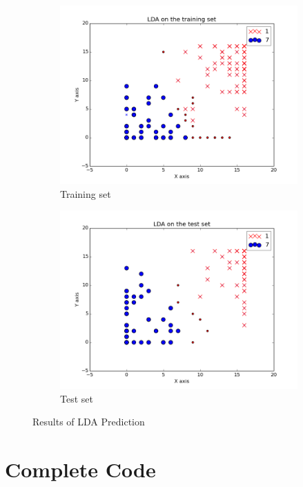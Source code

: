 \documentclass{article}
\begin{document}
\begin{figure}
        \centering
        \begin{subfigure}[b]{0.5\textwidth}
                \includegraphics[width=\textwidth]{../LDAtrainingset.png}
                \caption{Training set}
        \end{subfigure}%
        \begin{subfigure}[b]{0.5\textwidth}
                \includegraphics[width=\textwidth]{../LDAtestset.png}
                \caption{Test set}
        \end{subfigure}
        \caption{Results of LDA Prediction}
        \label{img6}
\end{figure}


\FloatBarrier


\section{Complete Code}


\end{document}
